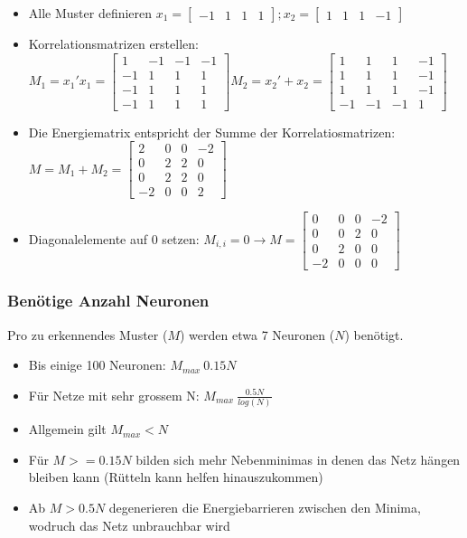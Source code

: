 \begin{itemize}
	\item Alle Muster definieren $x_1 = \begin{bmatrix}-1&1&1&1 \end{bmatrix};
			x_2 = \begin{bmatrix}1&1&1&-1\end{bmatrix}$
	\item Korrelationsmatrizen erstellen: $M_1 = x_1' x_1 =
		\begin{bmatrix}
			 1&-1&-1&-1 \\
			-1& 1& 1& 1 \\
			-1& 1& 1& 1 \\
			-1& 1& 1& 1
		\end{bmatrix} M_2 =x_2'+x_2 =
		\begin{bmatrix}
			 1& 1& 1&-1\\
			 1& 1& 1&-1\\
			 1& 1& 1&-1\\
			-1&-1&-1& 1
		\end{bmatrix}$
	\item Die Energiematrix entspricht der Summe der Korrelatiosmatrizen:
		$M = M_1 + M_2 = 
		\begin{bmatrix}
			 2&0&0&-2\\
			 0&2&2& 0\\
			 0&2&2& 0\\
			-2&0&0& 2
		\end{bmatrix}$
	\item Diagonalelemente auf 0 setzen: $M_{i,i} = 0 \rightarrow
		M=\begin{bmatrix}
			 0&0&0&-2\\
			 0&0&2& 0\\
			 0&2&0& 0\\
			-2&0&0& 0
		\end{bmatrix}$
\end{itemize}
\subsubsection{Benötige Anzahl Neuronen}
Pro zu erkennendes Muster ($M$) werden etwa 7 Neuronen ($N$) benötigt.
\begin{itemize}
	\item Bis einige 100 Neuronen: $M_{max} ~ 0.15N$
	\item Für Netze mit sehr grossem N: $M_{max} ~ \frac{0.5N}{log(N)}$
	\item Allgemein gilt $M_{max} < N$
	\item Für $M >= 0.15N$ bilden sich mehr Nebenminimas in denen das Netz
		hängen bleiben kann (Rütteln kann helfen hinauszukommen)
	\item Ab $M > 0.5N$ degenerieren die Energiebarrieren zwischen den Minima,
		wodruch das Netz unbrauchbar wird
\end{itemize}

